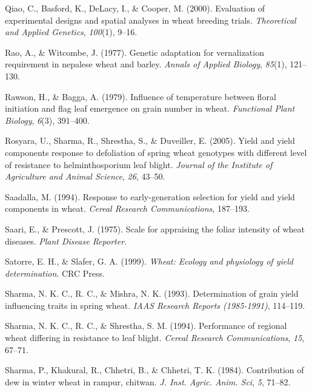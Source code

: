 \documentclass[12pt,oneside]{dukestatscithesis} %
\newlength{\cslhangindent}
\newenvironment{cslreferences}%
  {\setlength{\parindent}{0pt}%
  \everypar{\setlength{\hangindent}{\cslhangindent}}\ignorespaces}%
  {\par}
\begin{document}
\begin{cslreferences}
\leavevmode\hypertarget{ref-qiao2000evaluation}{}%
Qiao, C., Basford, K., DeLacy, I., \& Cooper, M. (2000). Evaluation of experimental designs and spatial analyses in wheat breeding trials. \emph{Theoretical and Applied Genetics}, \emph{100}(1), 9--16.

\leavevmode\hypertarget{ref-rao1977genetic}{}%
Rao, A., \& Witcombe, J. (1977). Genetic adaptation for vernalization requirement in nepalese wheat and barley. \emph{Annals of Applied Biology}, \emph{85}(1), 121--130.

\leavevmode\hypertarget{ref-rawson1979influence}{}%
Rawson, H., \& Bagga, A. (1979). Influence of temperature between floral initiation and flag leaf emergence on grain number in wheat. \emph{Functional Plant Biology}, \emph{6}(3), 391--400.

\leavevmode\hypertarget{ref-rosyara2005yield}{}%
Rosyara, U., Sharma, R., Shrestha, S., \& Duveiller, E. (2005). Yield and yield components response to defoliation of spring wheat genotypes with different level of resistance to helminthosporium leaf blight. \emph{Journal of the Institute of Agriculture and Animal Science}, \emph{26}, 43--50.

\leavevmode\hypertarget{ref-saadalla1994response}{}%
Saadalla, M. (1994). Response to early-generation selection for yield and yield components in wheat. \emph{Cereal Research Communications}, 187--193.

\leavevmode\hypertarget{ref-saari1975scale}{}%
Saari, E., \& Prescott, J. (1975). Scale for appraising the foliar intensity of wheat diseases. \emph{Plant Disease Reporter}.

\leavevmode\hypertarget{ref-satorre1999wheat}{}%
Satorre, E. H., \& Slafer, G. A. (1999). \emph{Wheat: Ecology and physiology of yield determination}. CRC Press.

\leavevmode\hypertarget{ref-sharma1993_yield_inf}{}%
Sharma, N. K. C., R. C., \& Mishra, N. K. (1993). Determination of grain yield influencing traits in spring wheat. \emph{IAAS Research Reports (1985-1991)}, 114--119.

\leavevmode\hypertarget{ref-sharma1994blight}{}%
Sharma, N. K. C., R. C., \& Shrestha, S. M. (1994). Performance of regional wheat differing in resistance to leaf blight. \emph{Cereal Research Communications}, \emph{15}, 67--71.

\leavevmode\hypertarget{ref-sharma1984contribution}{}%
Sharma, P., Khakural, R., Chhetri, B., \& Chhetri, T. K. (1984). Contribution of dew in winter wheat in rampur, chitwan. \emph{J. Inst. Agric. Anim. Sci}, \emph{5}, 71--82.


\end{cslreferences}
\end{document}
